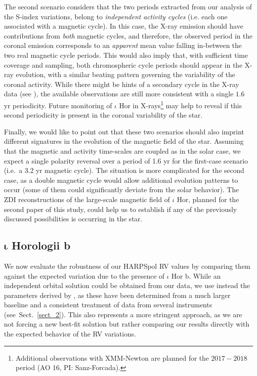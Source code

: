 \documentclass[a4paper,fleqn,usenatbib]{mnras}
\begin{document}
The second scenario considers that the two periods extracted from our analysis of the S-index variations, belong to \textit{independent activity cycles} (i.e. each one associated with a magnetic cycle). In this case, the X-ray emission should have contributions from \textit{both} magnetic cycles, and therefore, the observed period in the coronal emission corresponds to an \textit{apparent} mean value falling in-between the two real magnetic cycle periods. This would also imply that, with sufficient time coverage and sampling, both chromospheric cycle periods should appear in the X-ray evolution, with a similar beating pattern governing the variability of the coronal activity. While there might be hints of a secondary cycle in the X-ray data (see ), the available observations are still more consistent with a single $1.6$ yr periodicity. Future monitoring of $\iota$ Hor in X-rays\footnote[15]{Additional observations with XMM-Newton are planned for the $2017-2018$ period (AO 16, PI: Sanz-Forcada).} may help to reveal if this second periodicity is present in the coronal variability of the star.

Finally, we would like to point out that these two scenarios should also imprint different signatures in the evolution of the magnetic field of the star. Assuming that the magnetic and activity time-scales are coupled as in the solar case, we expect a single polarity reversal over a period of 1.6 yr for the first-case scenario (i.e.~a 3.2 yr magnetic cycle). The situation is more complicated for the second case, as a double magnetic cycle would allow additional evolution patterns to occur (some of them could significantly deviate from the solar behavior). The ZDI reconstructions of the large-scale magnetic field of $\iota$ Hor, planned for the second paper of this study, could help us to establish if any of the previously discussed possibilities is occurring in the star. %

\subsection{$\boldsymbol\iota$ Horologii b}\label{sec_planet}

We now evaluate the robustness of our HARPSpol RV values by comparing them against the expected variation due to the presence of $\iota$ Hor b. While an independent orbital solution could be obtained from our data, we use instead the parameters derived by , as these have been determined from a much larger baseline and a consistent treatment of data from several instruments (see~Sect.~\ref{sect_2}). This also represents a more stringent approach, as we are not forcing a new best-fit solution but rather comparing our results directly with the expected behavior of the RV variations.
\end{document}
